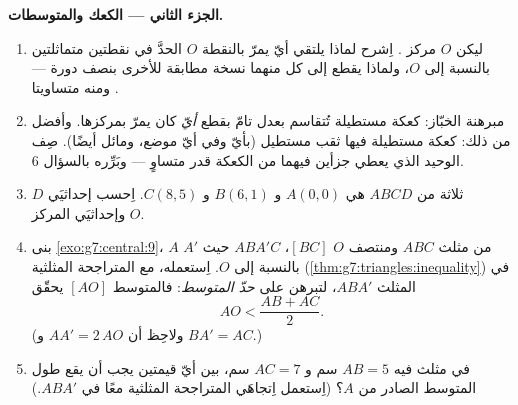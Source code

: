 \begin{problem}
\medskip
\noindent\textbf{الجزء الثاني --- الكعك والمتوسطات.}
\begin{enumerate}[resume]
  \item ليكن $O$ مركز . اِشرح لماذا
        يلتقي أيّ  يمرّ بالنقطة $O$ الحدَّ في نقطتين
        متماثلتين بالنسبة إلى $O$، ولماذا يقطع 
         إلى  كل منهما نسخة مطابقة
        للأخرى بنصف دورة --- ومنه متساويتا .
  \item مبرهنة الخبّاز: كعكة مستطيلة تُتقاسم
        بعدل تامّ بقطع  \emph{أيّ} كان يمرّ
        بمركزها. وأفضل من ذلك: كعكة مستطيلة فيها ثقب
        مستطيل (بأيّ  وفي أيّ موضع، ومائل أيضًا). صِف
          الوحيد الذي يعطي جزأين فيهما من
        الكعكة قدر متساوٍ --- وبَرِّره بالسؤال 6.
  \item ثلاثة  من  $ABCD$ هي $A(0, 0)$
        و $B(6, 1)$ و $C(8, 5)$. اِحسب إحداثيَي $D$
        وإحداثيَي المركز $O$.
  \item بنى \cref{exo:g7:central:9}، من مثلث $ABC$
        ومنتصف $O$  $[BC]$، 
        $ABA'C$ حيث $A'$  $A$ بالنسبة إلى $O$.
        اِستعمله، مع المتراجحة المثلثية
        (\cref{thm:g7:triangles:inequality}) في المثلث
        $ABA'$، لتبرهن على \emph{حدّ المتوسط}: فالمتوسط
        $[AO]$ يحقّق
        \[
        AO < \frac{AB + AC}{2} .
        \]
        (ولاحِظ أن $AA' = 2\,AO$ و $BA' = AC$.)
  \item في مثلث فيه $AB = 5$ سم و $AC = 7$ سم، بين أيّ
        قيمتين يجب أن يقع طول المتوسط الصادر من $A$؟
        (اِستعمل اِتجاهَي المتراجحة المثلثية معًا في
        $ABA'$.)
\end{enumerate}


\end{problem}

